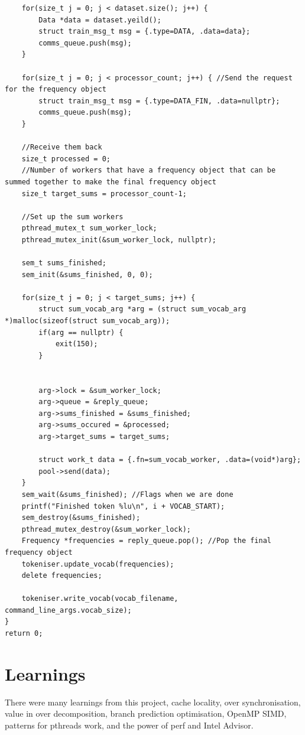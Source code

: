 \documentclass{article}
\begin{document}
\begin{verbatim}
    for(size_t j = 0; j < dataset.size(); j++) {
        Data *data = dataset.yeild(); 
        struct train_msg_t msg = {.type=DATA, .data=data};
        comms_queue.push(msg);
    }

    for(size_t j = 0; j < processor_count; j++) { //Send the request for the frequency object
        struct train_msg_t msg = {.type=DATA_FIN, .data=nullptr};
        comms_queue.push(msg);
    }

    //Receive them back
    size_t processed = 0;
    //Number of workers that have a frequency object that can be summed together to make the final frequency object
    size_t target_sums = processor_count-1; 

    //Set up the sum workers
    pthread_mutex_t sum_worker_lock;
    pthread_mutex_init(&sum_worker_lock, nullptr);

    sem_t sums_finished;
    sem_init(&sums_finished, 0, 0);

    for(size_t j = 0; j < target_sums; j++) {
        struct sum_vocab_arg *arg = (struct sum_vocab_arg *)malloc(sizeof(struct sum_vocab_arg));
        if(arg == nullptr) {
            exit(150);
        }
        

        arg->lock = &sum_worker_lock;
        arg->queue = &reply_queue;
        arg->sums_finished = &sums_finished;
        arg->sums_occured = &processed;
        arg->target_sums = target_sums;

        struct work_t data = {.fn=sum_vocab_worker, .data=(void*)arg};
        pool->send(data);
    }
    sem_wait(&sums_finished); //Flags when we are done
    printf("Finished token %lu\n", i + VOCAB_START);
    sem_destroy(&sums_finished);
    pthread_mutex_destroy(&sum_worker_lock);
    Frequency *frequencies = reply_queue.pop(); //Pop the final frequency object
    tokeniser.update_vocab(frequencies);
    delete frequencies;

    tokeniser.write_vocab(vocab_filename, command_line_args.vocab_size);
}
return 0;
\end{verbatim}

\section{Learnings}

There were many learnings from this project, cache locality, over synchronisation, 
value in over decomposition, branch prediction optimisation, OpenMP SIMD, patterns for pthreads work, 
and the power of perf and Intel Advisor. 
\end{document}
